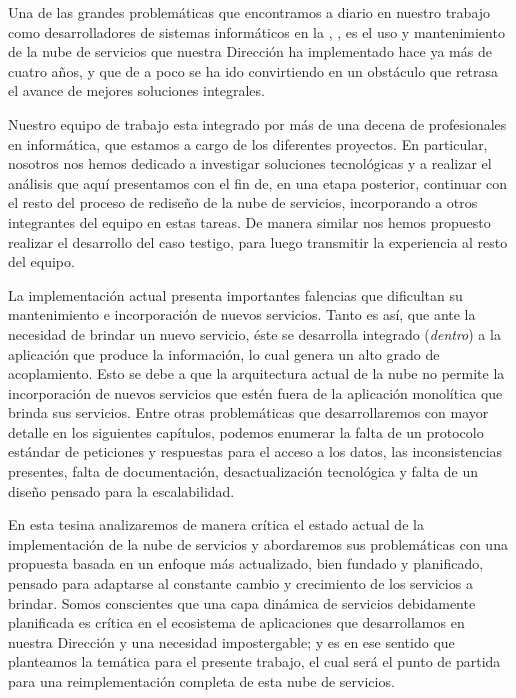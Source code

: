 Una de las grandes problemáticas que encontramos a diario en nuestro trabajo como desarrolladores de sistemas informáticos en la \direccionDesarrollo, \unlp, es el uso y mantenimiento de la nube de servicios que nuestra Dirección ha implementado hace ya más de cuatro años, y que de a poco se ha ido convirtiendo en un obstáculo que retrasa el avance de mejores soluciones integrales.

Nuestro equipo de trabajo esta integrado por más de una decena de profesionales en informática, que estamos a cargo de los diferentes proyectos. En particular, nosotros nos hemos dedicado a investigar soluciones tecnológicas y a realizar el análisis que aquí presentamos con el fin de, en una etapa posterior, continuar con el resto del proceso de rediseño de la nube de servicios, incorporando a otros integrantes del equipo en estas tareas. De manera similar nos hemos propuesto realizar el desarrollo del caso testigo, para luego transmitir la experiencia al resto del equipo.

La implementación actual presenta importantes falencias que dificultan su mantenimiento e incorporación de nuevos servicios. Tanto es así, que ante la necesidad de brindar un nuevo servicio, éste se desarrolla integrado (\textit{dentro}) a la aplicación que produce la información, lo cual genera un alto grado de acoplamiento. Esto se debe a que la arquitectura actual de la nube no permite la incorporación de nuevos servicios que estén fuera de la aplicación monolítica que brinda sus servicios. Entre otras problemáticas que desarrollaremos con mayor detalle en los siguientes capítulos, podemos enumerar la falta de un protocolo estándar de peticiones y respuestas para el acceso a los datos, las inconsistencias presentes, falta de documentación, desactualización tecnológica y falta de un diseño pensado para la escalabilidad.

En esta tesina analizaremos de manera crítica el estado actual de la implementación de la nube de servicios y abordaremos sus problemáticas con una propuesta basada en un enfoque más actualizado, bien fundado y planificado, pensado para adaptarse al constante cambio y crecimiento de los servicios a brindar. Somos conscientes que una capa dinámica de servicios debidamente planificada es crítica en el ecosistema de aplicaciones que desarrollamos en nuestra Dirección y una necesidad impostergable; y es en ese sentido que planteamos la temática para el presente trabajo, el cual será el punto de partida para una reimplementación completa de esta nube de servicios.
